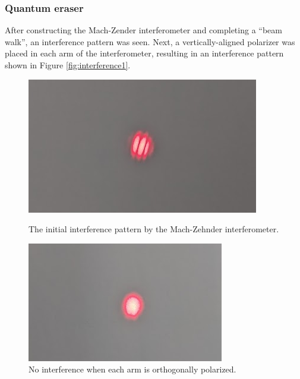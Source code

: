 \documentclass[notitlepage]{report}
\begin{document}
	\subsubsection{Quantum eraser}
	After constructing the Mach-Zender interferometer and completing a ``beam walk'', an interference pattern was seen. Next, a vertically-aligned polarizer was placed in each arm of the interferometer, resulting in an interference pattern shown in Figure \ref{fig:interference1}. 
	
	\begin{figure}[p]
		\begin{minipage}{0.5\linewidth}
		\centering
		\includegraphics[width=\linewidth]{interference1}
		\caption{The initial interference pattern by the Mach-Zehnder interferometer.}
		\label{fig:interference1}
		\end{minipage}
	\hfill
	\begin{minipage}{0.48\linewidth}
	\centering
	\includegraphics[width=\linewidth]{interference2}
	\caption{No interference when each arm is orthogonally polarized.}
	\label{fig:interference2}
	\end{minipage}


\end{figure}
\end{document}
